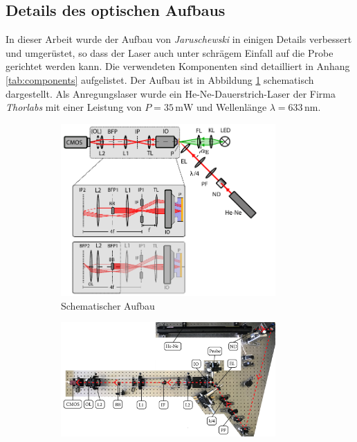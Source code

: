 \documentclass[titlepage,  ngerman]{article}
\begin{document}
	\subsection{Details des optischen Aufbaus}
	In dieser Arbeit wurde der Aufbau von \textit{Jaruschewski} \cite{Jaruschewski.2020} in einigen Details verbessert und umgerüstet, so dass der Laser auch unter schrägem Einfall auf die Probe gerichtet werden kann. Die verwendeten Komponenten sind detailliert in Anhang \ref{tab:components} aufgelistet. Der Aufbau ist in Abbildung \ref{fig:aufbau_schema} schematisch dargestellt. Als Anregungslaser wurde ein He-Ne-Dauerstrich-Laser der Firma \textit{Thorlabs} mit einer Leistung von $P = 35 \,\mathrm{mW}$ und Wellenlänge $\lambda = 633\,\mathrm{nm}$.
	\begin{figure}
		\centering
		\begin{subfigure}[b]{0.9\textwidth}		
			\centering
			\includegraphics[width=0.9\textwidth]{figures/Aufbau_Schema.pdf}
			\caption{Schematischer Aufbau}			
			\label{fig:aufbau_schema}
		\end{subfigure}
		\vfil
		\begin{subfigure}[b]{0.9\textwidth} 
			\centering
			\includegraphics[width=0.9\textwidth]{figures/aufsicht_aufbau_anotated.jpg}

\end{subfigure}
\end{figure}
\end{document}
